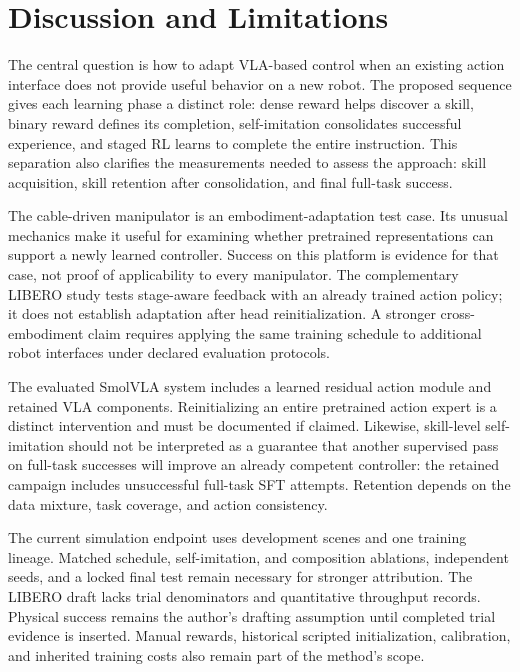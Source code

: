 \section{Discussion and Limitations}\label{sec:discussion}
The central question is how to adapt VLA-based control when an existing action interface does not provide useful behavior on a new robot. The proposed sequence gives each learning phase a distinct role: dense reward helps discover a skill, binary reward defines its completion, self-imitation consolidates successful experience, and staged RL learns to complete the entire instruction. This separation also clarifies the measurements needed to assess the approach: skill acquisition, skill retention after consolidation, and final full-task success.

The cable-driven manipulator is an embodiment-adaptation test case. Its unusual mechanics make it useful for examining whether pretrained representations can support a newly learned controller. Success on this platform is evidence for that case, not proof of applicability to every manipulator. The complementary LIBERO study tests stage-aware feedback with an already trained action policy; it does not establish adaptation after head reinitialization. A stronger cross-embodiment claim requires applying the same training schedule to additional robot interfaces under declared evaluation protocols.

The evaluated SmolVLA system includes a learned residual action module and retained VLA components. Reinitializing an entire pretrained action expert is a distinct intervention and must be documented if claimed. Likewise, skill-level self-imitation should not be interpreted as a guarantee that another supervised pass on full-task successes will improve an already competent controller: the retained campaign includes unsuccessful full-task SFT attempts. Retention depends on the data mixture, task coverage, and action consistency.

The current simulation endpoint uses development scenes and one training lineage. Matched schedule, self-imitation, and composition ablations, independent seeds, and a locked final test remain necessary for stronger attribution. The LIBERO draft lacks trial denominators and quantitative throughput records. Physical success remains the author's drafting assumption until completed trial evidence is inserted. Manual rewards, historical scripted initialization, calibration, and inherited training costs also remain part of the method's scope.
